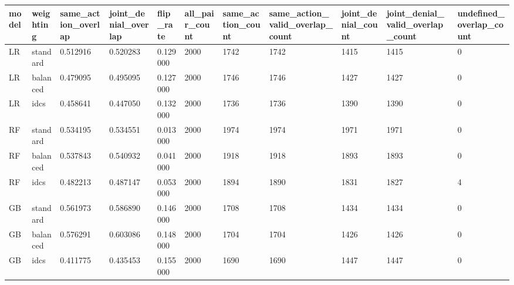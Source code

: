 \begin{tabular}{lllllllllll}
\hline
model & weighting & same\_action\_overlap & joint\_denial\_overlap & flip\_rate & all\_pair\_count & same\_action\_count & same\_action\_valid\_overlap\_count & joint\_denial\_count & joint\_denial\_valid\_overlap\_count & undefined\_overlap\_count \\
\hline
LR & standard & 0.512916 & 0.520283 & 0.129000 & 2000 & 1742 & 1742 & 1415 & 1415 & 0 \\
LR & balanced & 0.479095 & 0.495095 & 0.127000 & 2000 & 1746 & 1746 & 1427 & 1427 & 0 \\
LR & idcs & 0.458641 & 0.447050 & 0.132000 & 2000 & 1736 & 1736 & 1390 & 1390 & 0 \\
RF & standard & 0.534195 & 0.534551 & 0.013000 & 2000 & 1974 & 1974 & 1971 & 1971 & 0 \\
RF & balanced & 0.537843 & 0.540932 & 0.041000 & 2000 & 1918 & 1918 & 1893 & 1893 & 0 \\
RF & idcs & 0.482213 & 0.487147 & 0.053000 & 2000 & 1894 & 1890 & 1831 & 1827 & 4 \\
GB & standard & 0.561973 & 0.586890 & 0.146000 & 2000 & 1708 & 1708 & 1434 & 1434 & 0 \\
GB & balanced & 0.576291 & 0.603086 & 0.148000 & 2000 & 1704 & 1704 & 1426 & 1426 & 0 \\
GB & idcs & 0.411775 & 0.435453 & 0.155000 & 2000 & 1690 & 1690 & 1447 & 1447 & 0 \\
\hline
\end{tabular}
